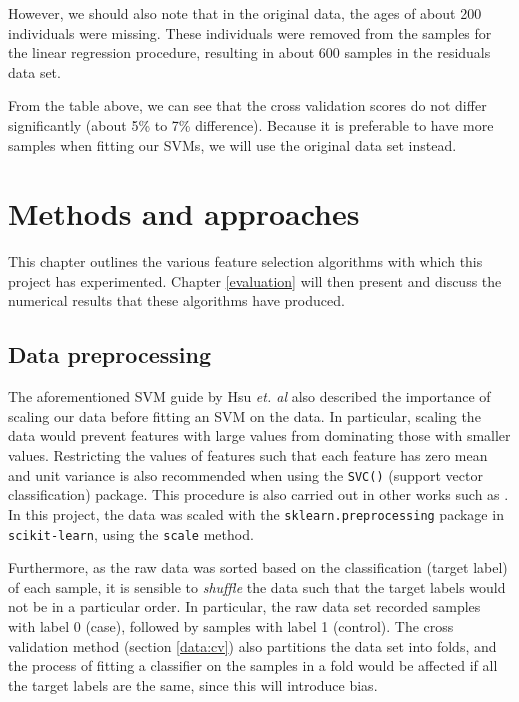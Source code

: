 \documentclass[12pt, twoside, a4paper]{report}
\begin{document}
However, we should also note that in the original data, the ages of about 200 individuals were missing. These individuals were removed from the samples for the linear regression procedure, resulting in about 600 samples in the residuals data set.

From the table above, we can see that the cross validation scores do not differ significantly (about 5\% to 7\% difference). Because it is preferable to have more samples when fitting our SVMs, we will use the original data set instead.


\chapter{Methods and approaches}
\label{methods}

This chapter outlines the various feature selection algorithms with which this project has experimented. Chapter \ref{evaluation} will then present and discuss the numerical results that these algorithms have produced. 

\section{Data preprocessing}

The aforementioned SVM guide by Hsu \textit{et. al} also described the importance of scaling our data before fitting an SVM on the data. In particular, scaling the data would prevent features with large values from dominating those with smaller values. Restricting the values of features such that each feature has zero mean and unit variance is also recommended when using the \texttt{SVC()} (support vector classification) package. This procedure is also carried out in other works such as \cite{RefWorks:228}. In this project, the data was scaled with the \texttt{sklearn.preprocessing} package in \texttt{scikit-learn}, using the \texttt{scale} method.

Furthermore, as the raw data was sorted based on the classification (target label) of each sample, it is sensible to \textit{shuffle} the data such that the target labels would not be in a particular order. In particular, the raw data set recorded samples with label 0 (case), followed by samples with label 1 (control). The cross validation method (section \ref{data:cv}) also partitions the data set into folds, and the process of fitting a classifier on the samples in a fold would be affected if all the target labels are the same, since this will introduce bias.
\end{document}
